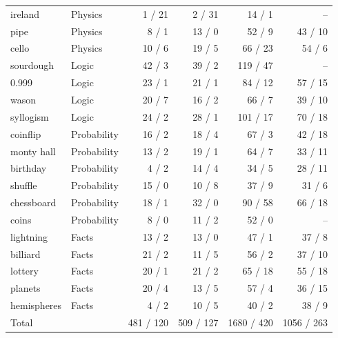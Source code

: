 \begin{table}[p]
\begin{tabular}{llrrrr}
ireland & Physics & 1 / 21 & 2 / 31 & 14 / 1 & -- \\
pipe & Physics & 8 / 1 & 13 / 0 & 52 / 9 & 43 / 10 \\
cello & Physics & 10 / 6 & 19 / 5 & 66 / 23 & 54 / 6 \\
sourdough & Logic & 42 / 3 & 39 / 2 & 119 / 47 & -- \\
0.999 & Logic & 23 / 1 & 21 / 1 & 84 / 12 & 57 / 15 \\
wason & Logic & 20 / 7 & 16 / 2 & 66 / 7 & 39 / 10 \\
syllogism & Logic & 24 / 2 & 28 / 1 & 101 / 17 & 70 / 18 \\
coinflip & Probability & 16 / 2 & 18 / 4 & 67 / 3 & 42 / 18 \\
monty hall & Probability & 13 / 2 & 19 / 1 & 64 / 7 & 33 / 11 \\
birthday & Probability & 4 / 2 & 14 / 4 & 34 / 5 & 28 / 11 \\
shuffle & Probability & 15 / 0 & 10 / 8 & 37 / 9 & 31 / 6 \\
chessboard & Probability & 18 / 1 & 32 / 0 & 90 / 58 & 66 / 18 \\
coins & Probability & 8 / 0 & 11 / 2 & 52 / 0 & -- \\
lightning & Facts & 13 / 2 & 13 / 0 & 47 / 1 & 37 / 8 \\
billiard & Facts & 21 / 2 & 11 / 5 & 56 / 2 & 37 / 10 \\
lottery & Facts & 20 / 1 & 21 / 2 & 65 / 18 & 55 / 18 \\
planets & Facts & 20 / 4 & 13 / 5 & 57 / 4 & 36 / 15 \\
hemispheres & Facts & 4 / 2 & 10 / 5 & 40 / 2 & 38 / 9 \\
\midrule
Total & & 481 / 120 & 509 / 127 & 1680 / 420 & 1056 / 263 \\
\bottomrule
\end{tabular}
\end{table}

